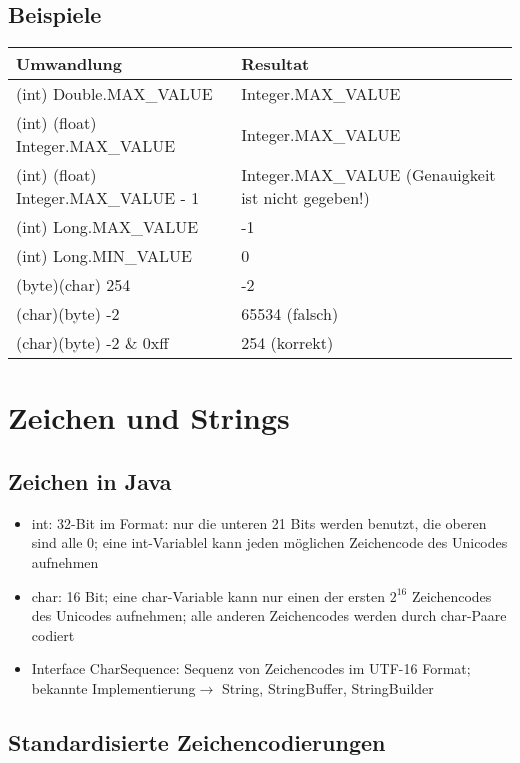 \documentclass[a4paper,10pt]{article}
\newcommand{\Bold}[1]{\textbf{#1}} %
\newcommand{\ra}{\rightarrow}
\begin{document}
\subsection{Beispiele}
\begin{tabular}{|l|l|}
\hline
\Bold{Umwandlung}&\Bold{Resultat}\\\hline\hline

(int) Double.MAX\_VALUE & Integer.MAX\_VALUE \\\hline
(int) (float) Integer.MAX\_VALUE & Integer.MAX\_VALUE \\\hline
(int) (float) Integer.MAX\_VALUE - 1 & Integer.MAX\_VALUE (Genauigkeit ist nicht gegeben!)\\\hline
(int) Long.MAX\_VALUE & -1\\\hline
(int) Long.MIN\_VALUE & 0 \\\hline

(byte)(char) 254 & -2 \\\hline
(char)(byte) -2 & 65534 (falsch) \\\hline
(char)(byte) -2 $\&$ 0xff & 254 (korrekt) \\\hline
\hline
\end{tabular}



\pagebreak
\section{Zeichen und Strings}
\subsection{Zeichen in Java}
\begin{itemize}
\item int: 32-Bit im Format: nur die unteren 21 Bits werden benutzt, die oberen sind alle 0; eine int-Variablel kann jeden m\"oglichen Zeichencode des Unicodes aufnehmen
\item char: 16 Bit; eine char-Variable kann nur einen der ersten $2^{16}$ Zeichencodes des Unicodes aufnehmen; alle anderen Zeichencodes werden durch char-Paare codiert
\item Interface CharSequence: Sequenz von Zeichencodes im UTF-16 Format; bekannte Implementierung$\ra$ String, StringBuffer, StringBuilder
\end{itemize}

\subsection{Standardisierte Zeichencodierungen}
\end{document}
